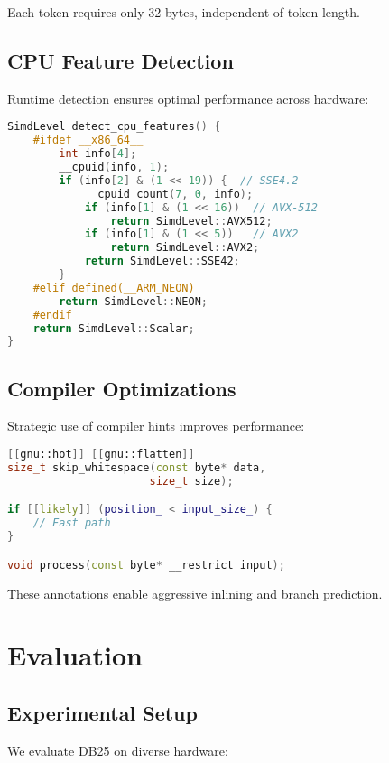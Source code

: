\documentclass[conference]{IEEEtran}
\begin{document}
Each token requires only 32 bytes, independent of token length.

\subsection{CPU Feature Detection}

Runtime detection ensures optimal performance across hardware:

\begin{lstlisting}[language=C++, basicstyle=\footnotesize]
SimdLevel detect_cpu_features() {
    #ifdef __x86_64__
        int info[4];
        __cpuid(info, 1);
        if (info[2] & (1 << 19)) {  // SSE4.2
            __cpuid_count(7, 0, info);
            if (info[1] & (1 << 16))  // AVX-512
                return SimdLevel::AVX512;
            if (info[1] & (1 << 5))   // AVX2
                return SimdLevel::AVX2;
            return SimdLevel::SSE42;
        }
    #elif defined(__ARM_NEON)
        return SimdLevel::NEON;
    #endif
    return SimdLevel::Scalar;
}
\end{lstlisting}

\subsection{Compiler Optimizations}

Strategic use of compiler hints improves performance:

\begin{lstlisting}[language=C++, basicstyle=\footnotesize]
[[gnu::hot]] [[gnu::flatten]]
size_t skip_whitespace(const byte* data, 
                      size_t size);

if [[likely]] (position_ < input_size_) {
    // Fast path
}

void process(const byte* __restrict input);
\end{lstlisting}

These annotations enable aggressive inlining and branch prediction.

\section{Evaluation}

\subsection{Experimental Setup}

We evaluate DB25 on diverse hardware:
\end{document}
